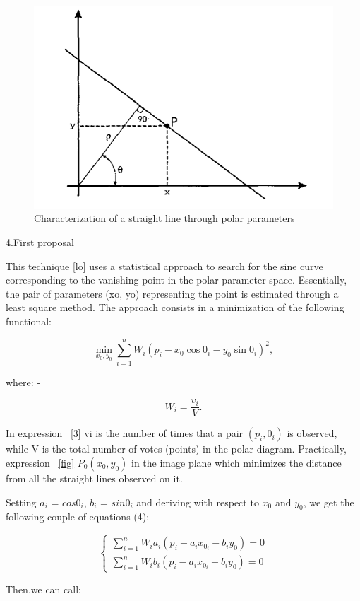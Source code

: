 \documentclass[12pt]{article}
\begin{document}
\begin{figure}
    \centering
    \includegraphics[width=0.75\linewidth]{image1.png}
    \caption{Characterization of a straight line through polar parameters}
    \label{label1}
\end{figure}



\newpage
4.First proposal

\raggedright This technique [lo] uses a statistical approach to search for the sine curve corresponding to the vanishing point in the polar parameter space. Essentially, the pair of parameters (xo, yo) representing the point is estimated through a least square method. The approach consists in a minimization of the following functional:
\noindent

\begin{equation}\label{fig}
\min_{x_0,y_0} ⁡\sum^n_{i=1} W_i  (p_i-x_0  \cos⁡0_i-y_0  \sin⁡{0_i})^2,
\end{equation}

\raggedright where:
\noindent
-

\begin{equation}\label{3}
W_i=\frac{v_i}{V}.
\end{equation}

\raggedright In expression ~\eqref{3} vi is the number of times that a pair $(p_i,0_i)$ is observed, while V is the total number of votes (points) in the polar diagram. Practically, expression  ~\eqref{fig} $P_0(x_0, y_0)$ in the image plane which minimizes the distance from all the straight lines observed on it.
\noindent
\newline
\raggedright Setting $a_i$ = $cos⁡{0_i}$, $b_i$ = $sin{0_i}$ and deriving with respect to $x_0$ and $y_0$, we get the following couple of equations (4\label{sum}):
\noindent

\begin{equation}\label{sum}
 \begin{cases}
  \sum^n_{i=1} W_i a_i (p_i-a_i x_0_i - b_i y_0) = 0 \\
  \sum^n_{i=1} W_i b_i (p_i-a_i x_0_i - b_i y_0) = 0 
\end{cases}
\end{equation}
\newline
\raggedright Then,we can call:
\noindent
\end{document}
